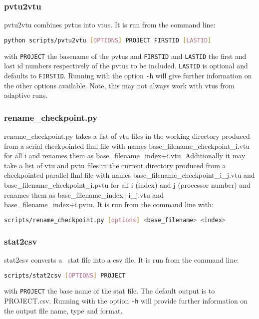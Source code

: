 
\subsubsection{pvtu2vtu}
\label{sect:pvtu2vtu}
pvtu2vtu combines pvtus into vtus. It is run from the command line:
\begin{lstlisting}[language = Bash]
python scripts/pvtu2vtu [OPTIONS] PROJECT FIRSTID [LASTID]
\end{lstlisting} 
with \lstinline[language = Bash]+PROJECT+ the basename of the pvtus and \lstinline[language = Bash]+FIRSTID+ and \lstinline[language = Bash]+LASTID+ the first and last id numbers respectively of the pvtus to be included. \lstinline[language = Bash]+LASTID+ is optional and defaults to \lstinline[language = Bash]+FIRSTID+. Running with the option \lstinline[language = Bash]+-h+ will give further information on the other options available. Note, this may not always work with vtus from adaptive runs.


\subsubsection{rename\_checkpoint.py}
\label{sect:rename_checkpoint}
rename\_checkpoint.py takes a list of vtu files in the working directory produced from a serial checkpointed flml file with names base\_filename\_checkpoint\_i.vtu for all i and renames them as base\_filename\_index+i.vtu. Additionally it may take a list of
vtu and pvtu files in the current directory produced from a checkpointed parallel flml file with names base\_filename\_checkpoint\_i\_j.vtu and base\_filename\_checkpoint\_i.pvtu for all i (index) and j (processor number) and renames them as base\_filename\_index+i\_j.vtu and base\_filename\_index+i.pvtu. It is run from the command line with:
\begin{lstlisting}[language = Bash]
scripts/rename_checkpoint.py [options] <base_filename> <index>
\end{lstlisting}



\subsubsection{stat2csv}
\label{sect:stat2csv}
stat2csv converts a \fluidity\ stat file into a csv file. It is run from the command line:
\begin{lstlisting}[language = Bash]
scripts/stat2csv [OPTIONS] PROJECT
\end{lstlisting} 
with \lstinline[language = Bash]+PROJECT+ the base name of the stat file. The default output is to PROJECT.csv. Running with the option \lstinline[language = Bash]+-h+ will provide further information on the output file name, type and format.

